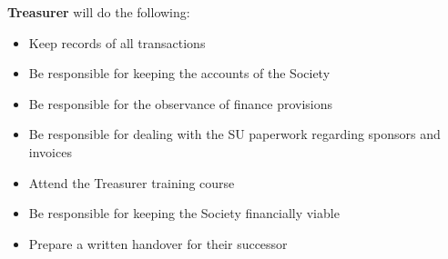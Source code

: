 \begin{subclause}
  \textbf{Treasurer} will do the following:
  \begin{itemize}[label=--,topsep=0em,itemsep=0em]
    \item Keep records of all transactions
    \item Be responsible for keeping the accounts of the Society
    \item Be responsible for the observance of finance provisions
    \item Be responsible for dealing with the SU paperwork regarding sponsors and invoices
    \item Attend the Treasurer training course
    \item Be responsible for keeping the Society financially viable
    \item Prepare a written handover for their successor
  \end{itemize}
\end{subclause}
